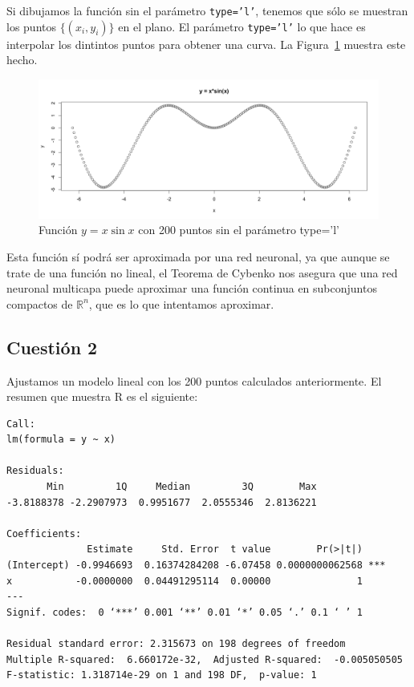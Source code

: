 \documentclass[12pt,a4paper,twoside,openright,titlepage,final]{article}
\begin{document}
Si dibujamos la función sin el parámetro \texttt{type='l'}, tenemos que sólo se muestran los puntos $\{(x_i, y_i)\}$ en el plano. El parámetro \texttt{type='l'} lo que hace es interpolar los dintintos puntos para obtener una curva. La Figura~\ref{fig:funcion_sin_type} muestra este hecho.\\

\begin{figure}[tbph!]
\centering
\includegraphics[width=0.8\linewidth]{imagenes/funcion_sin_type}
\caption{Función $y = x\sin x$ con 200 puntos sin el parámetro type='l'}
\label{fig:funcion_sin_type}
\end{figure}

Esta función sí podrá ser aproximada por una red neuronal, ya que aunque se trate de una función no lineal, el Teorema de Cybenko nos asegura que una red neuronal multicapa puede aproximar una función continua en subconjuntos compactos de $\mathbb{R}^n$, que es lo que intentamos aproximar.

\subsection{Cuestión 2}

Ajustamos un modelo lineal con los 200 puntos calculados anteriormente. El resumen que muestra R es el siguiente:

\begin{verbatim}
Call:
lm(formula = y ~ x)

Residuals:
       Min         1Q     Median         3Q        Max 
-3.8188378 -2.2907973  0.9951677  2.0555346  2.8136221 

Coefficients:
              Estimate     Std. Error  t value        Pr(>|t|)    
(Intercept) -0.9946693  0.16374284208 -6.07458 0.0000000062568 ***
x           -0.0000000  0.04491295114  0.00000               1    
---
Signif. codes:  0 ‘***’ 0.001 ‘**’ 0.01 ‘*’ 0.05 ‘.’ 0.1 ‘ ’ 1

Residual standard error: 2.315673 on 198 degrees of freedom
Multiple R-squared:  6.660172e-32,	Adjusted R-squared:  -0.005050505 
F-statistic: 1.318714e-29 on 1 and 198 DF,  p-value: 1
\end{verbatim}
\end{document}
